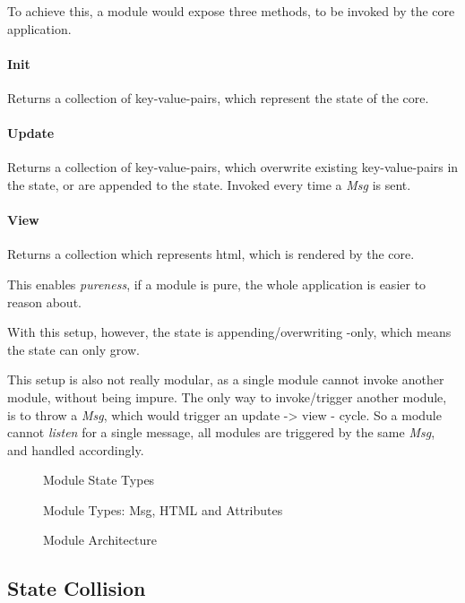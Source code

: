 To achieve this, a module would expose three methods, to be invoked by the core
application.

\paragraph{Init} Returns a collection of key-value-pairs, which represent
the state of the core.

\paragraph{Update} Returns a collection of key-value-pairs, which
overwrite existing key-value-pairs in the state, or are appended to the state.
Invoked every time a \textit{Msg} is sent.

\paragraph{View} Returns a collection which represents \gls{html},
which is rendered by the core.

This enables \textit{pureness}, if a module is pure, the whole application is
easier to reason about.

With this setup, however, the state is appending/overwriting -only, which means
the state can only grow.

This setup is also not really modular, as a single module cannot invoke another
module, without being impure. The only way to invoke/trigger another module, is
to throw a \textit{Msg}, which would trigger an update -> view - cycle. So
a module cannot \textit{listen} for a single message, all modules are triggered
by the same \textit{Msg}, and handled accordingly.

\begin{figure}
  \centering
  
  \caption{Module State Types}
\end{figure}

\begin{figure}
  \centering
  
  \caption{Module Types: Msg, HTML and Attributes}
\end{figure}

\begin{figure}
  \centering
 
  \caption{Module Architecture}
\end{figure}

\subsection{State Collision}

